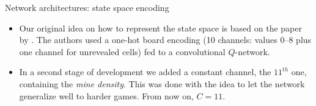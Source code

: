 
\begin{frame}{Network architectures: state space encoding}
    \begin{itemize}
        \item Our original idea on how to represent the state space is based on the paper by
              \textcite{wang2025minesweepercnn}. The authors used a \alert{one-hot board encoding} (10 channels: values $0$–$8$
              plus one channel for unrevealed cells) fed to a convolutional
              $Q$-network.
    \end{itemize}


    \begin{itemize}
        \item In a second stage of development we added a constant channel, the $11^{th}$ one, containing
              the \textit{mine density}. This was done with the idea to let the network generalize well
              to harder games. From now on, $C = 11$.
    \end{itemize}
\end{frame}


